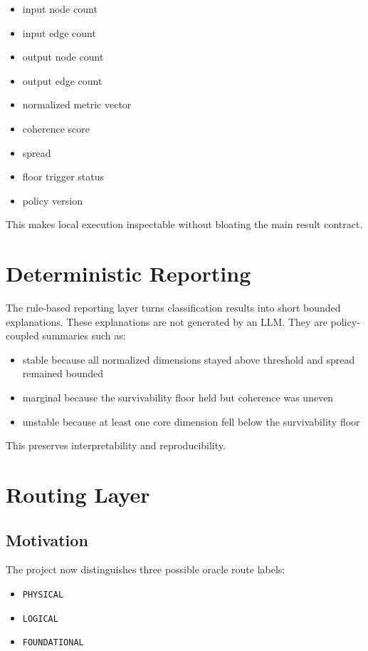 \documentclass[11pt]{article}
\begin{document}
\begin{itemize}
\item input node count
\item input edge count
\item output node count
\item output edge count
\item normalized metric vector
\item coherence score
\item spread
\item floor trigger status
\item policy version
\end{itemize}

This makes local execution inspectable without bloating the main result contract.

\section{Deterministic Reporting}

The rule-based reporting layer turns classification results into short bounded explanations.
These explanations are not generated by an LLM.
They are policy-coupled summaries such as:

\begin{itemize}
\item stable because all normalized dimensions stayed above threshold and spread remained bounded
\item marginal because the survivability floor held but coherence was uneven
\item unstable because at least one core dimension fell below the survivability floor
\end{itemize}

This preserves interpretability and reproducibility.

\section{Routing Layer}

\subsection{Motivation}

The project now distinguishes three possible oracle route labels:

\begin{itemize}
\item \texttt{PHYSICAL}
\item \texttt{LOGICAL}
\item \texttt{FOUNDATIONAL}
\end{itemize}
\end{document}
